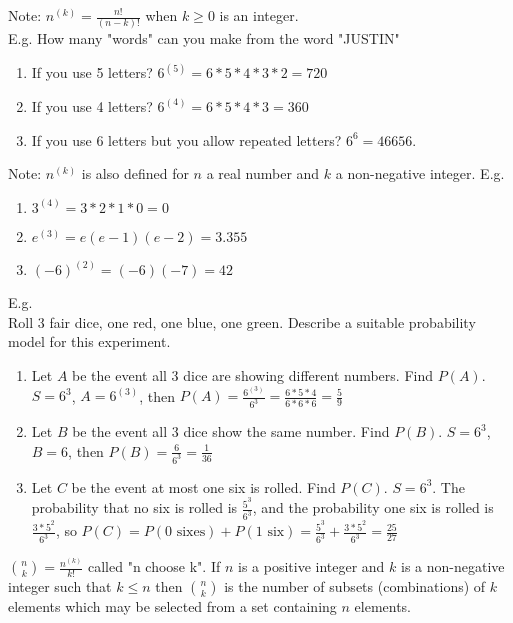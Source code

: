 \documentclass[10pt,letter]{article}
\begin{document}
Note: $n^{(k)}=\frac{n!}{(n-k)!}$ when $k\geq0$ is an integer. \\ 
E.g. How many "words" can you make from the word "JUSTIN"
\begin{enumerate}
    \item If you use 5 letters? $6^{(5)}=6*5*4*3*2=720$ 
    \item If you use 4 letters? $6^{(4)}=6*5*4*3=360$
    \item If you use 6 letters but you allow repeated letters? $6^6=46 656$. 
\end{enumerate}
Note: $n^{(k)}$ is also defined for $n$ a real number and $k$ a non-negative integer. E.g. 
\begin{enumerate}
    \item $3^{(4)} = 3*2*1*0=0$
    \item $e^{(3)}=e(e-1)(e-2)=3.355$
    \item $(-6)^{(2)}=(-6)(-7)=42$
\end{enumerate}
E.g. \\ 
Roll 3 fair dice, one red, one blue, one green. Describe a suitable probability model for this experiment. 
\begin{enumerate}
    \item Let $A$ be the event all 3 dice are showing different numbers. Find $P(A)$. $S=6^3$, $A=6^{(3)}$, then $P(A)=\frac{6^{(3)}}{6^3}=\frac{6*5*4}{6*6*6}=\frac{5}{9}$
    \item Let $B$ be the event all 3 dice show the same number. Find $P(B)$. $S=6^3$, $B=6$, then $P(B)=\frac{6}{6^3}=\frac{1}{36}$ 
    \item Let $C$ be the event at most one six is rolled. Find $P(C)$. $S=6^3$. The probability that no six is rolled is $\frac{5^3}{6^3}$, and the probability one six is rolled is $\frac{3*5^2}{6^3}$, so $P(C)=P(\text{0 sixes})+P(\text{1 six})=\frac{5^3}{6^3}+\frac{3*5^2}{6^3}=\frac{25}{27}$
\end{enumerate}

${n\choose k} = \frac{n^{(k)}}{k!}$ called "n choose k". If $n$ is a positive integer and $k$ is a non-negative integer such that $k\leq n$ then ${n\choose k}$ is the number of subsets (combinations) of $k$ elements which may be selected from a set containing $n$ elements. 
\end{document}
